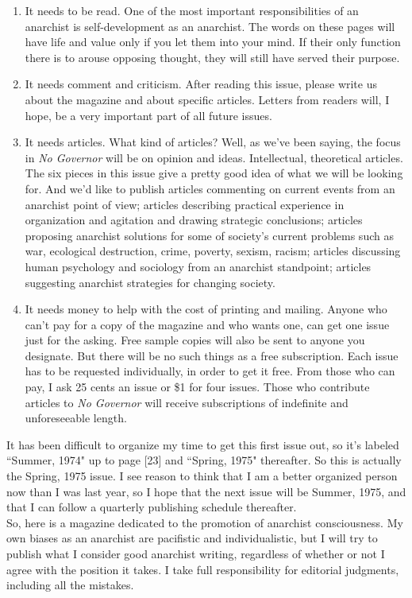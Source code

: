 \documentclass[12pt, onecolumn, letterpaper, oneside]{book}
\begin{document}
\begin{enumerate}
\item It needs to be read. One of the most important responsibilities of an anarchist is self-development as an anarchist. The words on these pages will have life and value only if you let them into your mind. If their only function there is to arouse opposing thought, they will still have served their purpose.
\item It needs comment and criticism. After reading this issue, please write us about the magazine and about specific articles. Letters from readers will, I hope, be a very important part of all future issues.
\item It needs articles. What kind of articles? Well, as we've been saying, the focus in \emph{No Governor} will be on opinion and ideas. Intellectual, theoretical articles. The six pieces in this issue give a pretty good idea of what we will be looking for. And we'd like to publish articles commenting on current events from an anarchist point of view; articles describing practical experience in organization and agitation and drawing strategic conclusions; articles proposing anarchist solutions for some of society's current problems such as war, ecological destruction, crime, poverty, sexism, racism; articles discussing human psychology and sociology from an anarchist standpoint; articles suggesting anarchist strategies for changing society.
\item It needs money to help with the cost of printing and mailing. Anyone who can't pay for a copy of the magazine and who wants one, can get one issue just for the asking. Free sample copies will also be sent to anyone you designate. But there will be no such things as a free subscription. Each issue has to be requested individually, in order to get it free. From those who can pay, I ask 25 cents an issue or \$1 for four issues. Those who contribute articles to \emph{No Governor} will receive subscriptions of indefinite and unforeseeable length.
\end{enumerate}
It has been difficult to organize my time to get this first issue out, so it's labeled ``Summer, 1974" up to page [23] and ``Spring, 1975" thereafter. So this is actually the Spring, 1975 issue. I see reason to think that I am a better organized person now than I was last year, so I hope that the next issue will be Summer, 1975, and that I can follow a quarterly publishing schedule thereafter.\\
So, here is a magazine dedicated to the promotion of anarchist consciousness. My own biases as an anarchist are pacifistic and individualistic, but I will try to publish what I consider good anarchist writing, regardless of whether or not I agree with the position it takes. I take full responsibility for editorial judgments, including all the mistakes.












\end{document}
